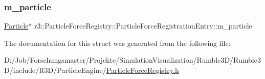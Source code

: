 \subsubsection{\texorpdfstring{m\+\_\+particle}{m\_particle}}
{\footnotesize\ttfamily \mbox{\hyperlink{classr3_1_1_particle}{Particle}}$\ast$ r3\+::\+Particle\+Force\+Registry\+::\+Particle\+Force\+Registration\+Entry\+::m\+\_\+particle}



The documentation for this struct was generated from the following file\+:\begin{DoxyCompactItemize}
\item 
D\+:/\+Job/\+Forschungsmaster/\+Projekte/\+Simulation\+Visualization/\+Rumble3\+D/\+Rumble3\+D/include/\+R3\+D/\+Particle\+Engine/\mbox{\hyperlink{_particle_force_registry_8h}{Particle\+Force\+Registry.\+h}}\end{DoxyCompactItemize}

